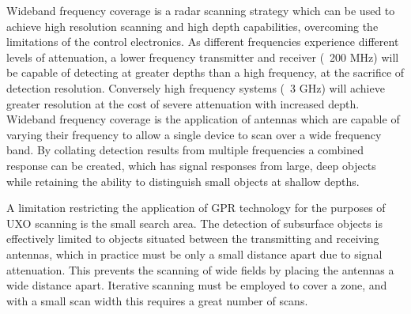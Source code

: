 \documentclass[main.tex]{subfiles}
\begin{document}
Wideband frequency coverage is a radar scanning strategy which can be used to achieve high resolution scanning and high depth capabilities, overcoming the limitations of the control electronics. As different frequencies experience different levels of attenuation, a lower frequency transmitter and receiver (~200 MHz) will be capable of detecting at greater depths than a high frequency, at the sacrifice of detection resolution. Conversely high frequency systems (~3 GHz) will achieve greater resolution at the cost of severe attenuation with increased depth. Wideband frequency coverage is the application of antennas which are capable of varying their frequency to allow a single device to scan over a wide frequency band. By collating detection results from multiple frequencies a combined response can be created, which has signal responses from large, deep objects while retaining the ability to distinguish small objects at shallow depths. 

A limitation restricting the application of GPR technology for the purposes of UXO scanning is the small search area. The detection of subsurface objects is effectively limited to objects situated between the transmitting and receiving antennas, which in practice must be only a small distance apart due to signal attenuation. This prevents the scanning of wide fields by placing the antennas a wide distance apart. Iterative scanning must be employed to cover a zone, and with a small scan width this requires a great number of scans.
\end{document}
